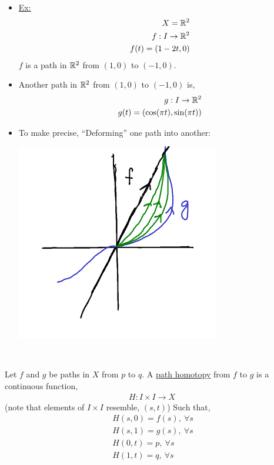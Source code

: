     \begin{itemize}
        \item \underline{Ex:}
            \begin{align*}
                X=\mathbb{R}^2\\
                f: I \rightarrow\mathbb{R}^2\\
                f(t)=(1-2t,0)\\
            \end{align*}
            $f$ is a path in $\mathbb{R}^2$ from $(1,0)$ to $(-1,0)$.
        \item Another path in $\mathbb{R}^2$ from $(1,0)$ to $(-1,0)$ is,
            \begin{align*}
                g: I \rightarrow \mathbb{R}^2\\
                g(t)=(\cos(\pi t),\sin(\pi t))\\
            \end{align*}
        \item To make precise, ``Deforming'' one path into another:\\
            \begin{minipage}[c]{\linewidth}
                \begin{center}
                    \includegraphics[]{images/homotopy_class_2.png}
                \end{center}
            \end{minipage}\\
    \end{itemize}
        \begin{definition}
            Let $f$ and $g$ be paths in $X$ from $p$ to $q$. A \underline{path homotopy} from $f$ to $g$ is a continuous function,
            \begin{align*}
                H: I\times I \rightarrow X\
            \end{align*}
            (note that elements of $I\times I$ resemble, $(s,t)$)
            Such that,
            \begin{align*}
                H(s,0)=f(s),\ \forall s\\
                H(s,1)=g(s),\ \forall s\\
                H(0,t)=p,\ \forall s\\
                H(1,t)=q,\ \forall s\\
            \end{align*}
        \end{definition}
